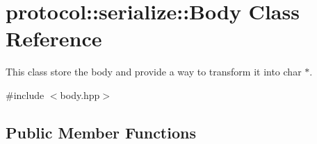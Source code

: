 \hypertarget{classprotocol_1_1serialize_1_1_body}{}\section{protocol\+:\+:serialize\+:\+:Body Class Reference}
\label{classprotocol_1_1serialize_1_1_body}


This class store the body and provide a way to transform it into char $\ast$.  




{\ttfamily \#include $<$body.\+hpp$>$}

\subsection*{Public Member Functions}
